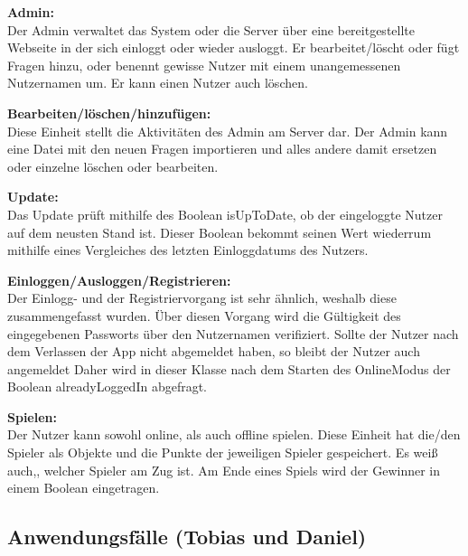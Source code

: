 \documentclass[fontsize=12pt,paper=a4,twoside]{scrartcl}
\begin{document}
\textbf{Admin:}\\
Der Admin verwaltet das System oder die Server über eine bereitgestellte Webseite in der
sich einloggt oder wieder ausloggt. Er bearbeitet/löscht oder fügt Fragen hinzu, oder 
benennt gewisse Nutzer mit einem unangemessenen Nutzernamen um. Er kann einen Nutzer auch
löschen.

\textbf{Bearbeiten/löschen/hinzufügen:}\\
Diese Einheit stellt die Aktivitäten des Admin am Server dar. Der Admin kann eine Datei 
mit den neuen Fragen importieren und alles andere damit ersetzen oder einzelne löschen 
oder bearbeiten.

\textbf{Update:}\\
Das Update prüft mithilfe des Boolean isUpToDate, ob der eingeloggte Nutzer auf dem neusten Stand ist.
Dieser Boolean bekommt seinen Wert wiederrum mithilfe eines Vergleiches des letzten Einloggdatums des
Nutzers.

\textbf{Einloggen/Ausloggen/Registrieren:}\\
Der Einlogg- und der Registriervorgang ist sehr ähnlich, weshalb diese zusammengefasst wurden. 
Über diesen Vorgang wird die Gültigkeit des eingegebenen Passworts über den Nutzernamen verifiziert.
Sollte der Nutzer nach dem Verlassen der App nicht abgemeldet haben, so bleibt der Nutzer auch angemeldet
Daher wird in dieser Klasse nach dem Starten des OnlineModus der Boolean alreadyLoggedIn abgefragt.

\textbf{Spielen:}\\
Der Nutzer kann sowohl online, als auch offline spielen. Diese Einheit hat die/den Spieler
als Objekte und die Punkte der jeweiligen Spieler gespeichert. Es weiß auch,, welcher Spieler am Zug ist.
Am Ende eines Spiels wird der Gewinner in einem Boolean eingetragen.



\subsection{Anwendungsfälle (Tobias und Daniel)}
\end{document}
